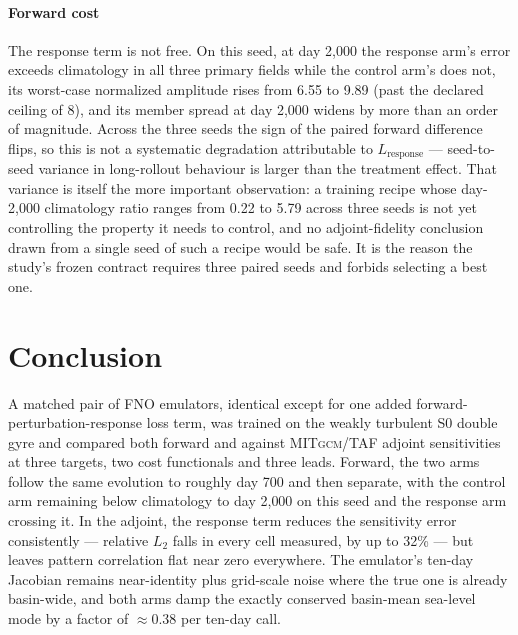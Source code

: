 \documentclass[3p,12pt]{elsarticle}
\newcommand{\MITgcm}{\textsc{MITgcm}}
\newcommand{\FNO}{FNO}
\begin{document}
\paragraph{Forward cost} The response term is not free. On this seed, at day
2{,}000 the response arm's error exceeds climatology in all three primary fields
while the control arm's does not, its worst-case normalized amplitude rises from
6.55 to 9.89 (past the declared ceiling of 8), and its member spread at day
2{,}000 widens by more than an order of magnitude. Across the three seeds the
sign of the paired forward difference flips, so this is not a systematic
degradation attributable to $L_{\mathrm{response}}$ --- seed-to-seed variance in
long-rollout behaviour is larger than the treatment effect. That variance is
itself the more important observation: a training recipe whose day-2{,}000
climatology ratio ranges from 0.22 to 5.79 across three seeds is not yet
controlling the property it needs to control, and no adjoint-fidelity conclusion
drawn from a single seed of such a recipe would be safe. It is the reason the
study's frozen contract requires three paired seeds and forbids selecting a best
one.

\section{Conclusion}
\label{sec:conclusion}

A matched pair of \FNO{} emulators, identical except for one added
forward-perturbation-response loss term, was trained on the weakly turbulent S0
double gyre and compared both forward and against \MITgcm{}/TAF adjoint
sensitivities at three targets, two cost functionals and three leads. Forward,
the two arms follow the same evolution to roughly day 700 and then separate, with the
control arm remaining below climatology to day 2{,}000 on this seed and the
response arm crossing it. In the adjoint, the response term reduces the
sensitivity error consistently --- relative $L_2$ falls in every cell measured,
by up to 32\% --- but leaves pattern correlation flat near zero everywhere. The
emulator's ten-day Jacobian remains near-identity plus grid-scale noise where the
true one is already basin-wide, and both arms damp the exactly conserved
basin-mean sea-level mode by a factor of $\approx0.38$ per ten-day call.
\end{document}
